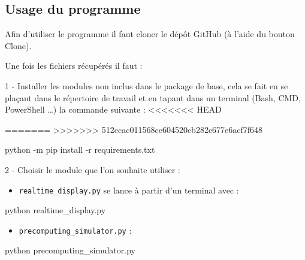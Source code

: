\documentclass[
]{article}
\newenvironment{Shaded}{}{}
\newcommand{\AttributeTok}[1]{\textcolor[rgb]{0.49,0.56,0.16}{#1}}
\newcommand{\ExtensionTok}[1]{#1}
\newcommand{\NormalTok}[1]{#1}
\providecommand{\tightlist}{%
  \setlength{\itemsep}{0pt}\setlength{\parskip}{0pt}}
\begin{document}
\hypertarget{usage-du-programme}{%
\subsection{Usage du programme}\label{usage-du-programme}}

Afin d'utiliser le programme il faut cloner le dépôt GitHub (à l'aide du
bouton Clone).

Une fois les fichiers récupérés il faut :

1 - Installer les modules non inclus dans le package de base, cela se
fait en se plaçant dans le répertoire de travail et en tapant dans un
terminal (Bash, CMD, PowerShell \ldots) la commande suivante :
\textless\textless\textless\textless\textless\textless\textless{} HEAD

=======
\textgreater\textgreater\textgreater\textgreater\textgreater\textgreater\textgreater{}
512ecac011568ce604520cb282e677e6acf7f648

\begin{Shaded}
\begin{Highlighting}[]
\ExtensionTok{python} \AttributeTok{{-}m}\NormalTok{ pip install }\AttributeTok{{-}r}\NormalTok{ requirements.txt}
\end{Highlighting}
\end{Shaded}

2 - Choisir le module que l'on souhaite utiliser :

\begin{itemize}
\tightlist
\item
  \texttt{realtime\_display.py} se lance à partir d'un terminal avec :
\end{itemize}

\begin{Shaded}
\begin{Highlighting}[]
\ExtensionTok{python}\NormalTok{ realtime\_display.py}
\end{Highlighting}
\end{Shaded}

\begin{itemize}
\tightlist
\item
  \texttt{precomputing\_simulator.py} :
\end{itemize}

\begin{Shaded}
\begin{Highlighting}[]
\ExtensionTok{python}\NormalTok{ precomputing\_simulator.py}
\end{Highlighting}
\end{Shaded}
\end{document}
